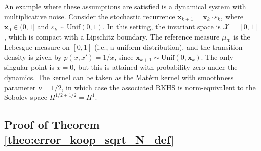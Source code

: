 \documentclass{article}
\begin{document}
An example where these assumptions are satisfied is a dynamical system with multiplicative noise. Consider the stochastic recurrence \(\mathbf{x}_{k+1} = \mathbf{x}_k \cdot \varepsilon_k\), where \(\mathbf{x}_0 \in (0, 1]\) and \(\varepsilon_k \sim \text{Unif}(0, 1)\). In this setting, the invariant space is \(\mathcal{X} = [0, 1]\), which is compact with a Lipschitz boundary. The reference measure \(\mu_{\mathcal{X}}\) is the Lebesgue measure on \([0, 1]\) (i.e., a uniform distribution), and the transition density is given by \(p(x, x') = 1/x\), since \(\mathbf{x}_{k+1} \sim \text{Unif}(0, \mathbf{x}_k)\). The only singular point is \(x = 0\), but this is attained with probability zero under the dynamics. The kernel can be taken as the Matérn kernel with smoothness parameter \(\nu = 1/2\), in which case the associated RKHS is norm-equivalent to the Sobolev space \(H^{1/2 + 1/2} = H^1\).

\subsection{Proof of Theorem \ref{theo:error_koop_sqrt_N_def}}
\end{document}
